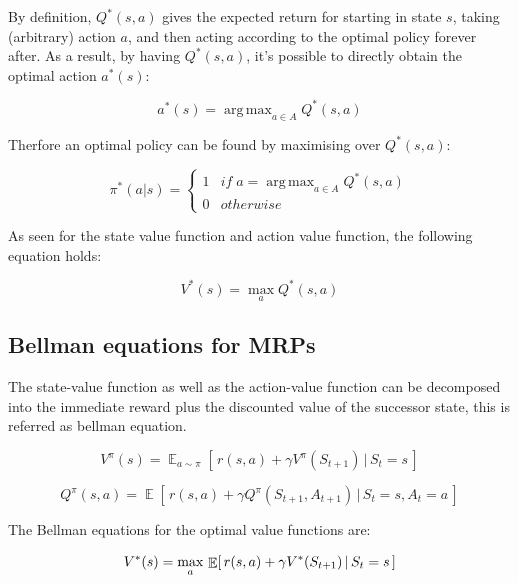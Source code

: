 \documentclass{article}
\DeclareMathOperator*{\E}{\mathbb{E}}
\DeclareMathOperator*{\argmax}{arg\,max}
\begin{document}
By definition, $Q^*(s,a)$ gives the expected return for starting in state $s$, taking (arbitrary) action $a$, and then acting according to the optimal policy forever after. As a result, by having $Q^*(s,a)$, it's possible to directly obtain the optimal action $a^*(s)$:

\begin{equation}
a^*(s) = \argmax_{a \in A} Q^* (s,a)
\end{equation}

Therfore an optimal policy can be found by maximising over $Q^*(s,a)$:

\begin{equation}
	\pi^*(a|s) = 
	\begin{cases}
		1 & if \; a = \argmax_{a \in A} Q^*(s,a)\\
		0 & otherwise
	\end{cases}
	\label{eq:opt-policy}
\end{equation}

As seen for the state value function and action value function, the following equation holds:

\begin{equation}
V^*(s) = \max_a Q^* (s,a)
\end{equation}

\subsection{Bellman equations for MRPs}
The state-value function as well as the action-value function can be decomposed into the immediate reward plus the discounted value of the successor state, this is referred as bellman equation.



	\begin{equation}
	V^{\pi}(s) = \E_{a \sim \pi} [\, {r(s, a) + \gamma V^{\pi}(S_{t+1}) \,|\, S_t=s} \,]	
	\end{equation}

	\begin{equation}
		Q^{\pi}(s,a) = \E[\, {r(s,a) + \gamma {Q^{\pi}(S_{t+1},A_{t+1})} \,|\, S_t=s, A_t = a} \,]
	\end{equation}

The Bellman equations for the optimal value functions are:


\begin{equation}
	V^{*}(s) = \max_a \, \E [\, {r(s, a) + \gamma V^{*}(S_{t+1}) \,|\, S_t=s} \,] \\
\end{equation}
\end{document}
